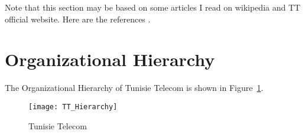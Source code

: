 

Note that this section may be based on some articles I read on wikipedia and TT official website.  Here are the references \citep{Arrighi2003, WithersMartinez2012, Ebejer2016}.

\section{Organizational Hierarchy}
The Organizational Hierarchy of Tunisie Telecom is shown in Figure~\ref{fig:test1}.


\begin{figure}[ht!] %
  \centering
  \texttt{[image: TT\_Hierarchy]}
  \caption[TT Hierarchy]{Tunisie Telecom }%
  \label{fig:test1}
\end{figure}







